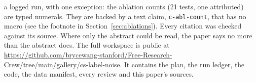 \begin{itemize}
        a logged run, with one exception: the ablation counts (21 tests, one attributed) are
        typed numerals. They are backed by a text claim, \texttt{c-abl-count}, that has no
        macro (see the footnote in Section~\ref{sec:ablations}). Every citation was checked against its
        source. Where only the abstract could be read, the paper says no more than the
        abstract does. The full workspace is public at
        \url{https://github.com/brycewang-stanford/Free-Research-Crew/tree/main/gallery/cs-label-noise}.
        It contains the plan, the run ledger, the code, the data manifest, every review and
        this paper's sources.
\end{itemize}
